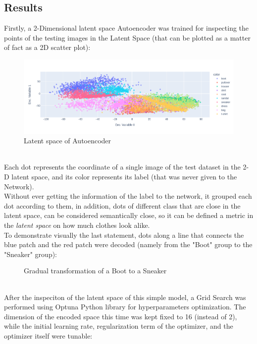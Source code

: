 \documentclass[11pt,a4paper,twocolumn]{IEEEtran}
\begin{document}
		\subsection{\textbf{Results}}
		Firstly, a 2-Dimensional latent space Autoencoder was trained for inspecting the points of the testing images in the Latent Space (that can be plotted as a matter of fact as a 2D scatter plot):\vspace*{-.5cm}
		\begin{figure}[h]
			\centering
			\hspace*{-1.3cm}\includegraphics[width=1.2\linewidth]{../imgs/newplot}
			\caption{Latent space of Autoencoder}
			\label{fig:2dlatent}
		\end{figure}\\
		Each dot represents the coordinate of a single image of the test dataset in the 2-D latent space, and its color represents its label (that was never given to the Network).\\
		Without ever getting the information of the label to the network, it grouped each dot according to them, in addition, dots of different class that are close in the latent space, can be considered semantically close, so it can be defined a metric in the \textit{latent space} on how much clothes look alike.\\
		To demonstrate visually the last statement, dots along a line that connects the blue patch and the red patch were decoded (namely from the "Boot" group to the "Sneaker" group):\vspace*{-.5cm}
		\begin{figure}[h]
			\centering
			
			\vspace*{-1cm} %
			\caption{Gradual transformation of a Boot to a Sneaker}
			\label{fig:trasf}
		\end{figure}\medskip\\
		After the inspeciton of the latent space of this simple model, a Grid Search was performed using Optuna Python library for hyperparameters optimization. The dimension of the encoded space this time was kept fixed to 16 (instead of 2), while the initial learning rate, regularization term of the optimizer, and the optimizer itself were tunable:
\end{document}
